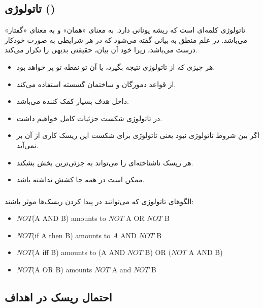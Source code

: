 \subsection{تاتولوژی ()}

تاتولوژی کلمه‌ای است که ریشه یونانی دارد.  به معنای «همان» و
 به معنای «گفتار» می‌باشد. در علم منطق به بیانی گفته می‌شود که در هر
شرایطی به صورت خودکار درست می‌باشد، زیرا خود آن بیان، حقیقتی بدیهی را تکرار
می‌کند.

\begin{itemize}
    \item هر چیزی که از تاتولوژی نتیجه بگیرد،  یا  آن تو نقطه تو
    پر خواهد بود.
    \item از قواعد دمورگان و ساختمان گسسته استفاده می‌کند.
    \item داخل هدف بسیار کمک کننده می‌باشد.
    \item در تاتولوژی شکست جزئیات کامل خواهیم داشت.
    \item اگر بین شروط تاتولوژی نبود یعنی تاتولوژی برای شکست این ریسک کاری از آن
    بر نمی‌آید.
    \item هر ریسک ناشناخته‌ای را می‌تواند به جزئی‌ترین بخش بشکند.
    \item ممکن است در همه جا کشش نداشته باشد.
\end{itemize}

\subsubsection{}

الگو‌های تاتولوژی که می‌توانند در پیدا کردن ریسک‌ها موثر باشند:

\begin{LTR}
    \begin{itemize}
        \item $NOT$(A AND B) amounts to $NOT$ A OR $NOT$ B
        \item $NOT$(if A then B) amounts to $A$ AND $NOT$ B
        \item $NOT$(A iff B) amounts to (A AND $NOT$ B) OR $(NOT$ A AND B)
        \item $NOT$(A OR B) amounts $NOT$ A and $NOT$ B
    \end{itemize}
\end{LTR}

\subsection{احتمال ریسک در اهداف }

